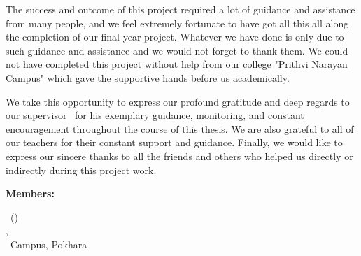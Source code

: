 
The success and outcome of this project required a lot of guidance and assistance from many people, and we feel extremely fortunate to have got all this all along the completion of our final year project. Whatever we have done is only due to such guidance and assistance and we would not forget to thank them. We could not have completed this project without help from our college "Prithvi Narayan Campus" which gave the supportive hands before us academically.

We take this opportunity to express our profound gratitude and deep regards to our supervisor \SupervisorName\ for his exemplary guidance, monitoring, and constant encouragement throughout the course of this thesis. We are also grateful to all of our teachers for their constant support and guidance. Finally, we would like to express our sincere thanks to all the friends and others who helped us directly or indirectly during this project work.

\vspace{3\baselineskip}
\noindent
{\bfseries\fontsize{14}{16}\selectfont Members:\par}
\noindent
{\fontsize{12}{14}\selectfont
\ReportAuthor\ (\SymbolNumber)\\
\ProgramName , \SemesterName\\[1\baselineskip]
\CampusName\ Campus, Pokhara
}

